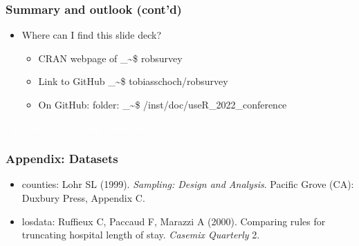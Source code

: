 \documentclass[framenumber,t]{beamer}
\makeatletter
\newcommand\code{\bgroup\@makeother\_\@makeother\~\@makeother\$\@makeother\^\@codex}
\def\@codex#1{{\normalfont\ttfamily\hyphenchar\font=-1 #1}\egroup}
\makeatother
\begin{document}
\begin{frame}
    \frametitle{Summary and outlook {\small (cont'd)}}
    \vspace{1em}
    \begin{itemize}
        \setlength\itemsep{0.75em}
        \item Where can I find this slide deck?
        \vspace{0.5em}
        {\large
        \begin{itemize}
            \setlength\itemsep{0.5em}
            \item \alert{CRAN} webpage of \code{robsurvey}
            \item \alert{Link} to \alert{GitHub} \code{tobiasschoch/robsurvey}
            \item On GitHub: \alert{folder:}
                \code{/inst/doc/useR\_2022\_conference}
        \end{itemize}
        }
    \end{itemize}
\end{frame}

\bgroup
{}
\begin{frame}[c,plain]{}
\begin{center}
    \textcolor{white}{\Huge I'm ready to take your questions!}
\end{center}
\end{frame}
\egroup

\begin{frame}
    \frametitle{Appendix: Datasets}
    {\footnotesize
    \begin{itemize}
        \setlength\itemsep{0.5em}
        \item \alert{counties}: Lohr SL (1999). \emph{Sampling: Design and
            Analysis}. Pacific Grove (CA): Duxbury Press, Appendix C.
        \item \alert{losdata}: Ruffieux C, Paccaud F, Marazzi A (2000).
            Comparing rules for truncating hospital length of stay.
            \emph{Casemix Quarterly} 2.
    \end{itemize}
    }
\end{frame}
\end{document}
